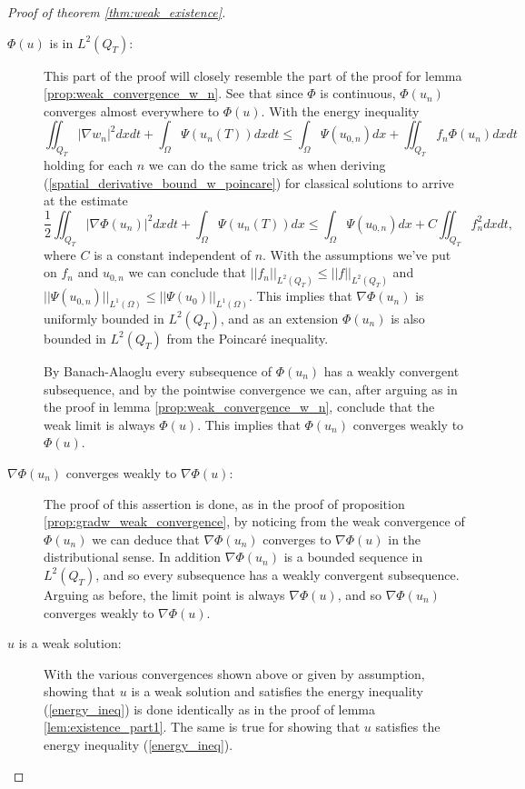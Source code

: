\documentclass[11pt, a4paper]{article}
\begin{document}
\begin{proof}[Proof of theorem \ref{thm:weak_existence}]
\begin{description}
\item[$\Phi(u)$ is in $L^2(Q_T)$:]
This part of the proof will closely resemble the part of the proof for lemma \ref{prop:weak_convergence_w_n}. See that since $\Phi$ is continuous, $\Phi(u_n)$ converges almost everywhere to $\Phi(u)$. With the energy inequality
\begin{equation*}
\iint_{Q_T} |\nabla w_n|^2dxdt + \int_{\Omega} \Psi(u_n(T))dxdt \leq \int_\Omega \Psi(u_{0,n})dx + \iint_{Q_T}f_n \Phi(u_n)dxdt
\end{equation*}
holding for each $n$ we can do the same trick as when deriving (\ref{spatial_derivative_bound_w_poincare}) for classical solutions to arrive at the estimate
\begin{equation}
\frac{1}{2}\iint_{Q_T}|\nabla \Phi(u_n)|^2 dxdt + \int_\Omega \Psi(u_n(T))dx \leq \int_\Omega \Psi(u_{0,n})dx + C\iint_{Q_T}f_n^2dxdt,
\end{equation}
where $C$ is a constant independent of $n$.
With the assumptions we've put on $f_n$ and $u_{0,n}$ we can conclude that $||f_n||_{L^2(Q_T)} \leq ||f||_{L^2(Q_T)}$ and $||\Psi(u_{0,n})||_{L^1(\Omega)} \leq ||\Psi(u_0)||_{L^1(\Omega)}$. This implies that $\nabla \Phi(u_n)$ is uniformly bounded in $L^2(Q_T)$, and as an extension $\Phi(u_n)$ is also bounded in $L^2(Q_T)$ from the Poincaré inequality.

By Banach-Alaoglu every subsequence of $\Phi(u_n)$ has a weakly convergent subsequence, and by the pointwise convergence we can, after arguing as in the proof in lemma \ref{prop:weak_convergence_w_n}, conclude that the weak limit is always $\Phi(u)$. This implies that $\Phi(u_n)$ converges weakly to $\Phi(u)$.

\item[$\nabla \Phi(u_n)$ converges weakly to $\nabla \Phi(u)$:]
The proof of this assertion is done, as in the proof of proposition \ref{prop:gradw_weak_convergence}, by noticing from the weak convergence of $\Phi(u_n)$ we can deduce that $\nabla \Phi(u_n)$ converges to $\nabla \Phi(u)$ in the distributional sense. In addition $\nabla \Phi(u_n)$ is a bounded sequence in $L^2(Q_T)$, and so every subsequence has a weakly convergent subsequence. Arguing as before, the limit point is always $\nabla \Phi(u)$, and so $\nabla \Phi(u_n)$ converges weakly to $\nabla \Phi(u)$.


\item[$u$ is a weak solution:]
With the various convergences shown above or given by assumption, showing that $u$ is a weak solution and satisfies the energy inequality (\ref{energy_ineq}) is done identically as in the proof of lemma \ref{lem:existence_part1}. The same is true for showing that $u$ satisfies the energy inequality (\ref{energy_ineq}).
\end{description}
\end{proof}
\end{document}

